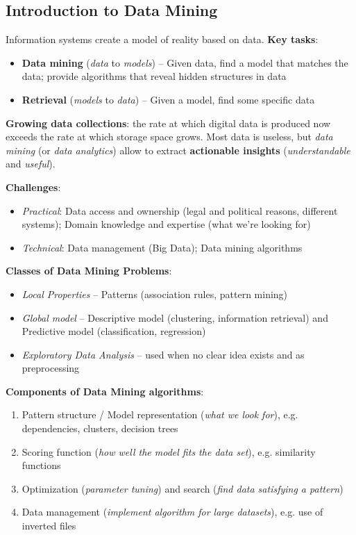 \subsection{Introduction to Data Mining} %
\label{sub:introduction_to_data_mining}
  Information systems create a model of reality based on data. \textbf{Key tasks}:
  \begin{itemize}
    \item \textbf{Data mining} (\emph{data} to \emph{models}) -- Given data, find a model that matches the data; provide algorithms that reveal hidden structures in data
    \item \textbf{Retrieval} (\emph{models} to \emph{data}) -- Given a model, find some specific data
  \end{itemize}

  \textbf{Growing data collections}: the rate at which digital data is produced now exceeds the rate at which storage space grows. Most data is useless, but \emph{data mining} (or \emph{data analytics}) allow to extract \textbf{actionable insights} (\emph{understandable} and \emph{useful}).

  \textbf{Challenges}:
  \begin{itemize}
    \item\emph{Practical}: Data access and ownership (legal and political reasons, different systems); Domain knowledge and expertise (what we're looking for)
    \item\emph{Technical}: Data management (Big Data); Data mining algorithms
  \end{itemize}

  \textbf{Classes of Data Mining Problems}:
  \begin{itemize}
    \item \emph{Local Properties} -- Patterns (association rules, pattern mining)
    \item \emph{Global model} -- Descriptive model (clustering, information retrieval) and Predictive model (classification, regression)
    \item \emph{Exploratory Data Analysis} -- used when no clear idea exists and as preprocessing
  \end{itemize}

  \textbf{Components of Data Mining algorithms}:
  \begin{enumerate}
    \item Pattern structure / Model representation (\emph{what we look for}), e.g. dependencies, clusters, decision trees
    \item Scoring function (\emph{how well the model fits the data set}), e.g. similarity functions
    \item Optimization (\emph{parameter tuning}) and search (\emph{find data satisfying a pattern})
    \item Data management (\emph{implement algorithm for large datasets}), e.g. use of inverted files
  \end{enumerate}

